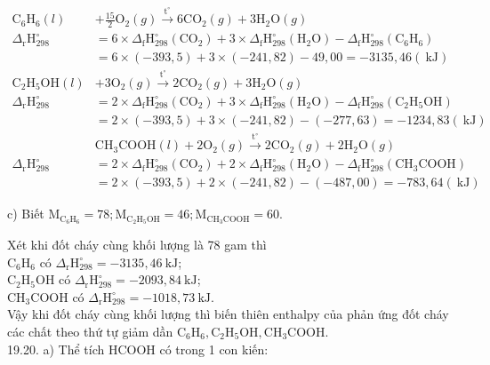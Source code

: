 \documentclass[10pt]{article}
\begin{document}
\begin{align*}
\mathrm{C}_{6} \mathrm{H}_{6}(l) & +\frac{15}{2} \mathrm{O}_{2}(g) \xrightarrow{\mathrm{t}^{\circ}} 6 \mathrm{CO}_{2}(g)+3 \mathrm{H}_{2} \mathrm{O}(g)  \tag{1}\\
\Delta_{\mathrm{r}} \mathrm{H}_{298}^{\circ} & =6 \times \Delta_{\mathrm{f}} \mathrm{H}_{298}^{\circ}\left(\mathrm{CO}_{2}\right)+3 \times \Delta_{\mathrm{f}} \mathrm{H}_{298}^{\circ}\left(\mathrm{H}_{2} \mathrm{O}\right)-\Delta_{\mathrm{f}} \mathrm{H}_{298}^{\circ}\left(\mathrm{C}_{6} \mathrm{H}_{6}\right) \\
& =6 \times(-393,5)+3 \times(-241,82)-49,00=-3135,46(\mathrm{~kJ}) \\
\mathrm{C}_{2} \mathrm{H}_{5} \mathrm{OH}(l) & +3 \mathrm{O}_{2}(g) \xrightarrow{\mathrm{t}^{\circ}} 2 \mathrm{CO}_{2}(g)+3 \mathrm{H}_{2} \mathrm{O}(g)  \tag{2}\\
\Delta_{\mathrm{r}} \mathrm{H}_{298}^{\circ} & =2 \times \Delta_{\mathrm{f}} \mathrm{H}_{298}^{\circ}\left(\mathrm{CO}_{2}\right)+3 \times \Delta_{\mathrm{f}} \mathrm{H}_{298}^{\circ}\left(\mathrm{H}_{2} \mathrm{O}\right)-\Delta_{\mathrm{f}} \mathrm{H}_{298}^{\circ}\left(\mathrm{C}_{2} \mathrm{H}_{5} \mathrm{OH}\right) \\
& =2 \times(-393,5)+3 \times(-241,82)-(-277,63)=-1234,83(\mathrm{~kJ}) \\
& \mathrm{CH}_{3} \mathrm{COOH}(l)+2 \mathrm{O}_{2}(g) \xrightarrow{\mathrm{t}^{\circ}} 2 \mathrm{CO}_{2}(g)+2 \mathrm{H}_{2} \mathrm{O}(g)  \tag{3}\\
\Delta_{\mathrm{r}} \mathrm{H}_{298}^{\circ} & =2 \times \Delta_{\mathrm{f}} \mathrm{H}_{298}^{\circ}\left(\mathrm{CO}_{2}\right)+2 \times \Delta_{\mathrm{f}} \mathrm{H}_{298}^{\circ}\left(\mathrm{H}_{2} \mathrm{O}\right)-\Delta_{\mathrm{f}} \mathrm{H}_{298}^{\circ}\left(\mathrm{CH}_{3} \mathrm{COOH}\right) \\
& =2 \times(-393,5)+2 \times(-241,82)-(-487,00)=-783,64(\mathrm{~kJ})
\end{align*}


c) Biết $\mathrm{M}_{\mathrm{C}_{6} \mathrm{H}_{6}}=78 ; \mathrm{M}_{\mathrm{C}_{2} \mathrm{H}_{5} \mathrm{OH}}=46 ; \mathrm{M}_{\mathrm{CH}_{3} \mathrm{COOH}}=60$.

Xét khi đốt cháy cùng khối lượng là 78 gam thì\\
$\mathrm{C}_{6} \mathrm{H}_{6}$ có $\Delta_{\mathrm{r}} \mathrm{H}_{298}^{\circ}=-3135,46 \mathrm{~kJ}$;\\
$\mathrm{C}_{2} \mathrm{H}_{5} \mathrm{OH}$ có $\Delta_{\mathrm{r}} \mathrm{H}_{298}^{\circ}=-2093,84 \mathrm{~kJ}$;\\
$\mathrm{CH}_{3} \mathrm{COOH}$ có $\Delta_{\mathrm{r}} \mathrm{H}_{298}^{\circ}=-1018,73 \mathrm{~kJ}$.\\
Vậy khi đốt cháy cùng khối lượng thì biến thiên enthalpy của phản ứng đốt cháy các chất theo thứ tự giảm dần $\mathrm{C}_{6} \mathrm{H}_{6}, \mathrm{C}_{2} \mathrm{H}_{5} \mathrm{OH}, \mathrm{CH}_{3} \mathrm{COOH}$.\\
19.20. a) Thể tích HCOOH có trong 1 con kiến:
\end{document}

